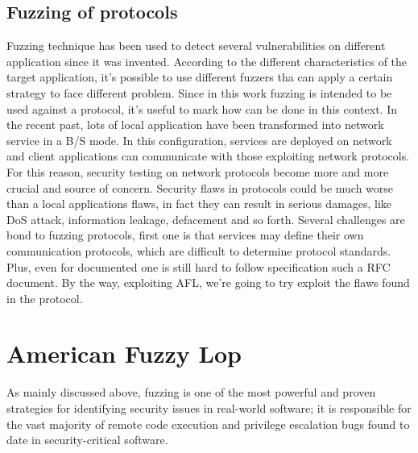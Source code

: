 \subsection{Fuzzing of protocols}
Fuzzing technique has been used to detect several vulnerabilities on different application since it was invented. 
According to the different characteristics of the target application, it's possible to use different fuzzers tha can apply a certain strategy to face different problem.
Since in this work fuzzing is intended to be used against a protocol, it's useful to mark how can be done in this context.
In the recent past, lots of local application have been transformed into network service in a B/S mode. In this configuration, services are deployed on network and client applications can communicate with those exploiting network protocols.
For this reason, security testing on network protocols become more and more crucial and source of concern. Security flaws in protocols could be much worse than a local applications flaws, in fact they can result in serious damages, like DoS attack, information leakage, defacement and so forth.
Several challenges are bond to fuzzing protocols, first one is that services may define their own communication protocols, which are difficult to determine protocol standards. Plus, even for documented one is still hard to follow specification such a RFC document.
By the way, exploiting AFL, we're going to try exploit the flaws found in the \fwh protocol. \cite{fzn}



\section{American Fuzzy Lop} %

As mainly discussed above, fuzzing is one of the most powerful and proven strategies for identifying
security issues in real-world software; it is responsible for the vast majority of remote code execution and privilege escalation bugs found to date in security-critical software.



